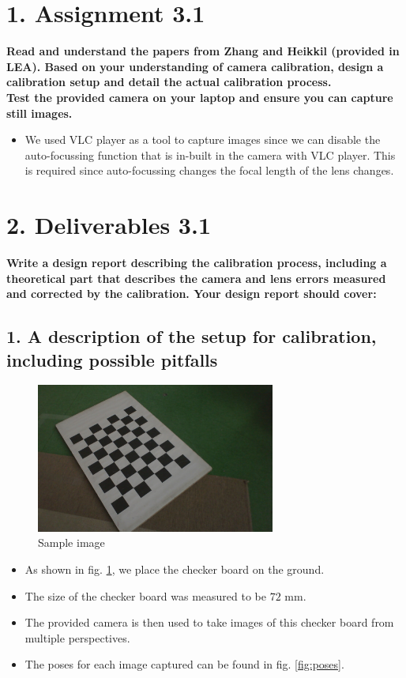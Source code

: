 \section*{1. Assignment 3.1}
\textbf{Read and understand the papers from Zhang and Heikkil (provided in LEA). Based on your understanding of camera calibration, design a calibration setup and detail the actual calibration process. \\
Test the provided camera on your laptop and ensure you can capture still images.}

\begin{itemize}
\item We used VLC player as a tool to capture images since we can disable the auto-focussing function that is in-built in the camera with VLC player. This is required since auto-focussing changes the focal length of the lens changes.
\end{itemize}

\section*{2. Deliverables 3.1}
\textbf{Write a design report describing the calibration process, including a theoretical part that describes the camera and lens errors measured and corrected by the calibration. Your design report should cover:}

\subsection*{1. A description of the setup for calibration, including possible pitfalls}
\begin{figure}[H]
\begin{center}
\includegraphics[width=0.7\textwidth]{data/1.jpg}
\caption{Sample image}
\label{fig:sample}
\end{center}
\end{figure}
\begin{itemize}
\item As shown in fig. \ref{fig:sample}, we place the checker board on the ground.
\item The size of the checker board was measured to be $72$ mm.
\item The provided camera is then used to take images of this checker board from multiple perspectives.
\item The poses for each image captured can be found in fig. \ref{fig:poses}.
\end{itemize}

